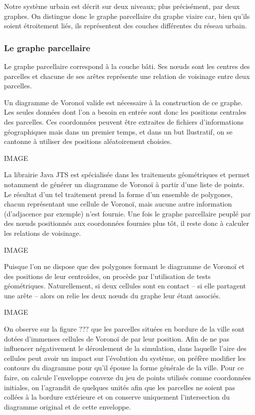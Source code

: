 \documentclass[10pt]{article}
\begin{document}
Notre système urbain est décrit sur deux niveaux; plus précisément,
par deux graphes. On distingue donc le graphe parcellaire du graphe
viaire car, bien qu'ils soient étroitement liés, ils représentent des
couches différentes du réseau urbain.

\subsubsection{Le graphe parcellaire}

Le graphe parcellaire correspond à la couche bâti. Ses n\oe uds sont
les centres des parcelles et chacune de ses arêtes représente une
relation de voisinage entre deux parcelles.

Un diagramme de Voronoï valide est nécessaire à la construction de ce
graphe. Les seules données dont l'on a besoin en entrée sont donc les
positions centrales des parcelles. Ces coordonnées peuvent être
extraites de fichiers d'informations géographiques mais dans un
premier temps, et dans un but llustratif, on se cantonne à utiliser
des positions aléatoirement choisies.

IMAGE

La librairie Java JTS est spécialisée dans les traitements
géométriques et permet notamment de générer un diagramme de Voronoï à
partir d'une liste de points. Le résultat d'un tel traitement prend la
forme d'un ensemble de polygones, chacun représentant une cellule de
Voronoï, mais aucune autre information (d'adjacence par exemple) n'est
fournie. Une fois le graphe parcellaire peuplé par des n\oe uds
positionnés aux coordonnées fournies plus tôt, il reste donc à
calculer les relations de voisinage.

IMAGE

Puisque l'on ne dispose que des polygones formant le diagramme de
Voronoï et des positions de leur centroïdes, on procède par
l'utilisation de tests géométriques. Naturellement, si deux cellules
sont en contact -- si elle partagent une arête -- alors on relie les
deux n\oe uds du graphe leur étant associés.

IMAGE

On observe sur la figure ??? que les parcelles situées en bordure de
la ville sont dotées d'immenses cellules de Voronoï de par leur
position. Afin de ne pas influencer négativement le déroulement de la
simulation, dans laquelle l'aire des cellules peut avoir un impact sur
l'évolution du système, on préfère modifier les contours du diagramme
pour qu'il épouse la forme générale de la ville. Pour ce faire, on
calcule l'enveloppe convexe du jeu de points utilisés comme
coordonnées initiales, on l'agrandit de quelques unités afin que les
parcelles ne soient pas collées à la bordure extérieure et on conserve
uniquement l'intersection du diagramme original et de cette enveloppe.
\end{document}
